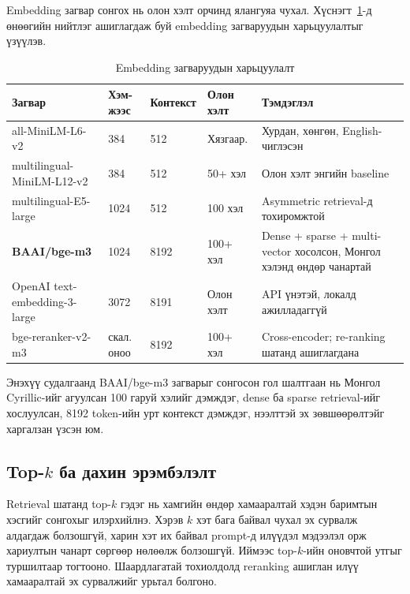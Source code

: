 Embedding загвар сонгох нь олон хэлт орчинд ялангуяа чухал. Хүснэгт~\ref{tab:embedding-models}-д өнөөгийн нийтлэг ашиглагдаж буй embedding загваруудын харьцуулалтыг үзүүлэв.

\begin{center}
\begin{table}[!htbp]
\begin{tabular}{|p{3.6cm}|p{1.5cm}|p{1.5cm}|p{1.5cm}|p{4.5cm}|}
\hline
\textbf{Загвар} & \textbf{ Хэм- жээс} & \textbf{ Контекст} & \textbf{Олон хэлт} & \textbf{Тэмдэглэл} \\ \hline
all-MiniLM-L6-v2~\cite{sentence_bert} & 384 & 512 & Хязгаар. & Хурдан, хөнгөн, English-чиглэсэн \\ \hline
multilingual-MiniLM-L12-v2~\cite{sentence_bert} & 384 & 512 & 50+ хэл & Олон хэлт энгийн baseline \\ \hline
multilingual-E5-large & 1024 & 512 & 100 хэл & Asymmetric retrieval-д тохиромжтой \\ \hline
\textbf{BAAI/bge-m3}~\cite{bge_m3} & 1024 & 8192 & 100+ хэл & Dense + sparse + multi-vector хосолсон, Монгол хэлэнд өндөр чанартай \\ \hline
OpenAI text-embedding-3-large & 3072 & 8191 & Олон хэлт & API үнэтэй, локалд ажилладаггүй \\ \hline
bge-reranker-v2-m3~\cite{bge_reranker} & скал. оноо & 8192 & 100+ хэл & Cross-encoder; re-ranking шатанд ашиглагдана \\ \hline
\end{tabular}
\caption[Embedding загваруудын харьцуулалт]{Embedding загваруудын харьцуулалт}
\label{tab:embedding-models}
\end{table}
\end{center}

Энэхүү судалгаанд BAAI/bge-m3 загварыг сонгосон гол шалтгаан нь Монгол Cyrillic-ийг агуулсан 100 гаруй хэлийг дэмждэг, dense ба sparse retrieval-ийг хослуулсан, 8192 token-ийн урт контекст дэмждэг, нээлттэй эх зөвшөөрөлтэйг харгалзан үзсэн юм.

\subsection{Top-$k$ ба дахин эрэмбэлэлт}

Retrieval шатанд top-$k$ гэдэг нь хамгийн өндөр хамааралтай хэдэн баримтын хэсгийг сонгохыг илэрхийлнэ. Хэрэв $k$ хэт бага байвал чухал эх сурвалж алдагдаж болзошгүй, харин хэт их байвал prompt-д илүүдэл мэдээлэл орж хариултын чанарт сөргөөр нөлөөлж болзошгүй. Иймээс top-$k$-ийн оновчтой утгыг туршилтаар тогтооно. Шаардлагатай тохиолдолд reranking ашиглан илүү хамааралтай эх сурвалжийг урьтал болгоно.

